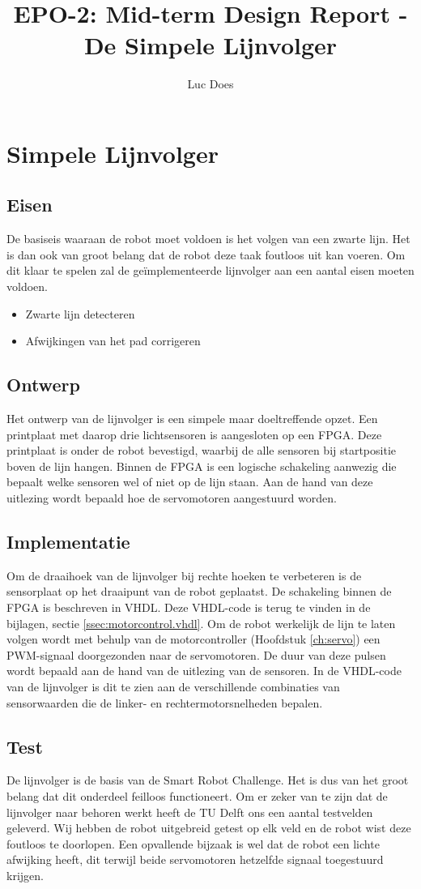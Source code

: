 \documentclass{report}
\title{EPO-2: Mid-term Design Report - De Simpele Lijnvolger}
\author{Luc Does}
\begin{document}
\chapter{Simpele Lijnvolger}
\label{ch:lijnvolger}

\section{Eisen}
De basiseis waaraan de robot moet voldoen is het volgen van een zwarte lijn.
Het is dan ook van groot belang dat de robot deze taak foutloos uit kan voeren.
Om dit klaar te spelen zal de geïmplementeerde lijnvolger aan een aantal eisen moeten voldoen.

\begin{itemize}
\item Zwarte lijn detecteren
\item Afwijkingen van het pad corrigeren
\end{itemize}

\section{Ontwerp}
Het ontwerp van de lijnvolger is een simpele maar doeltreffende opzet.
Een printplaat met daarop drie lichtsensoren is aangesloten op een FPGA.
Deze printplaat is onder de robot bevestigd, waarbij de alle sensoren bij startpositie boven de lijn hangen.
Binnen de FPGA is een logische schakeling aanwezig die bepaalt welke sensoren wel of niet op de lijn staan.
Aan de hand van deze uitlezing wordt bepaald hoe de servomotoren aangestuurd worden.

\section{Implementatie}
Om de draaihoek van de lijnvolger bij rechte hoeken te verbeteren is de sensorplaat op het draaipunt van de robot geplaatst.
De schakeling binnen de FPGA is beschreven in VHDL.
Deze VHDL-code is terug te vinden in de bijlagen, sectie \ref{ssec:motorcontrol.vhdl}.
Om de robot werkelijk de lijn te laten volgen wordt met behulp van de motorcontroller (Hoofdstuk \ref{ch:servo}) een PWM-signaal doorgezonden naar de servomotoren.
De duur van deze pulsen wordt bepaald aan de hand van de uitlezing van de sensoren.
In de VHDL-code van de lijnvolger is dit te zien aan de verschillende combinaties van sensorwaarden die de linker- en rechtermotorsnelheden bepalen.

\section{Test}
De lijnvolger is de basis van de Smart Robot Challenge.
Het is dus van het groot belang dat dit onderdeel feilloos functioneert.
Om er zeker van te zijn dat de lijnvolger naar behoren werkt heeft de TU Delft ons een aantal testvelden geleverd.
Wij hebben de robot uitgebreid getest op elk veld en de robot wist deze foutloos te doorlopen.
Een opvallende bijzaak is wel dat de robot een lichte afwijking heeft, dit terwijl beide servomotoren hetzelfde signaal toegestuurd krijgen.
\end{document}
